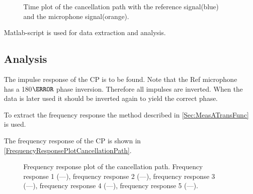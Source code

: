 \begin{figure}[H]
	\centering
	
	\caption{Time plot of the cancellation path with the reference signal(blue) and the microphone signal(orange).}
	\label{AmplitudePlotCancellationPath}
\end{figure}

Matlab-script  is used for data extraction and analysis.



\subsection{Analysis}
The impulse response of the CP is to be found.
Note that the Ref microphone has a 180$\degree$ phase inversion. Therefore all impulses are inverted. When the data is later used it should be inverted again to yield the correct phase. \cite{michandbook}

To extract the frequency response the method described in \autoref{Sec:MeasATransFunc} is used.



The frequency response of the CP is shown in \autoref{FrequencyResponsePlotCancellationPath}.

\begin{figure}[H]
	\centering
	
	\caption{Frequency response plot of the cancellation path. Frequency response 1 (\textcolor{MATLABblue}{---}), 
	frequency response 2 (\textcolor{MATLABorange}{---}), 	
	frequency response 3 (\textcolor{MATLAByellow}{---}), 	
	frequency response 4 (\textcolor{MATLABpurple}{---}), 	
	frequency response 5 (\textcolor{MATLABgreen}{---}).}
	\label{FrequencyResponsePlotCancellationPath}
\end{figure}

